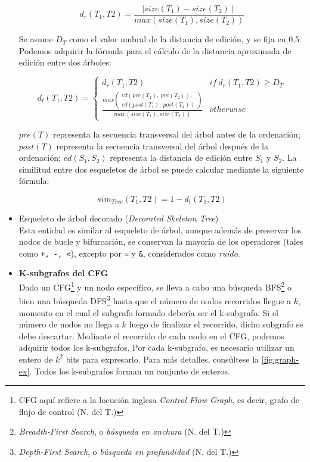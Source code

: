 \begin{itemize}
	\begin{equation}
	d_{r}(T_{1}, T{2})=\frac{\mid size(T_{1})-size(T_{2})\mid}{max(size(T_{1}), size(T_{2}))}
	\end{equation}

	Se asume $D_T$ como el valor umbral de la distancia de edición, y se fija en 0,5. Podemos adquirir la fórmula para el cálculo de la distancia aproximada de edición entre dos árboles:

	\begin{equation}
	d_{t}(T_{1}, T{2})=\begin{cases}d_{r}(T_{1}, T{2}) & if~d_{r}(T_{1}, T{2})\geq D_{T}\\\frac{max\left(\begin{array}{c}ed(pre(T_{1}),~pre(T_{2})),\\ ed(post(T_{1}),~post(T_{2}))\end{array}\right)}{max(size(T_{1}), size(T_{2}))} & otherwise\end{cases}
	\end{equation}

	$pre(T)$ representa la secuencia transversal del árbol antes de la ordenación; $post(T)$ representa la secuencia transversal del árbol después de la ordenación; $ed(S_{1}, S_{2})$ representa la distancia de edición entre $S_{1}$ y $S_{2}$. La similitud entre dos esqueletos de árbol se puede calcular mediante la siguiente fórmula:

	\begin{equation}
	sim_{Tree}(T_{1}, T{2})=1-d_{t}(T_{1}, T{2})
	\end{equation}

	\item Esqueleto de árbol decorado (\textit{Decorated Skeleton Tree}) \\
	Esta entidad es similar al esqueleto de árbol, aunque además de preservar los nodos de bucle y bifurcación, se conservan la mayoría de los operadores (tales como \texttt{+, -, <}), excepto por \texttt{=} y \texttt{\&}, considerados como \textit{ruido}.

	\item \textbf{K-subgrafos del CFG} \\
	Dado un CFG\footnote{CFG aquí refiere a la locución inglesa \textit{Control Flow Graph}, es decir, grafo de flujo de control (N. del T.)} y un nodo específico, se lleva a cabo una búsqueda BFS\footnote{\textit{Breadth-First Search}, o \textit{búsqueda en anchura} (N. del T.)} o bien una búsqueda DFS\footnote{\textit{Depth-First Search}, o \textit{búsqueda en profundidad} (N. del T.)} hasta que el número de nodos recorridos llegue a $k$, momento en el cual el subgrafo formado debería ser el k-subgrafo. Si el número de nodos no llega a $k$ luego de finalizar el recorrido, dicho subgrafo se debe descartar. Mediante el recorrido de cada nodo en el CFG, podemos adquirir todos los k-subgrafos. Por cada k-subgrafo, es necesario utilizar un entero de $k^2$ bits para expresarlo. Para más detalles, consúltese la \ref{fig:graph-ex}. Todos los k-subgrafos forman un conjunto de enteros.


\end{itemize}
